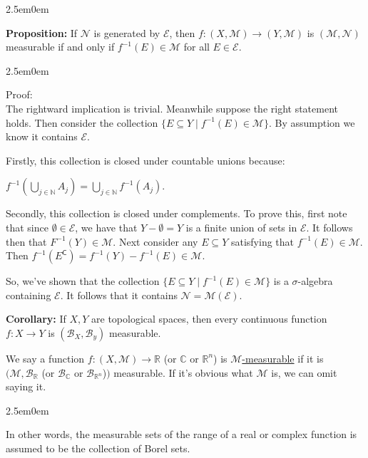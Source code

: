 \documentclass{book}
\newcommand{\hTwo}{%
\color{MidnightBlue}%
   \fontsize{13}{15}\selectfont%
}
\newcommand{\hThree}{%
   \color{PineGreen!85!Orange}
   \fontsize{12}{14}\selectfont%
}
\newenvironment{myIndent}{%
   \begin{adjustwidth}{2.5em}{0em}%
}{%
   \end{adjustwidth}%
}
\newcommand{\udefine}[1]{{%
   \setulcolor{Red}%
   \setul{0.14em}{0.07em}%
   \ul{#1}%
}}
\newcommand{\blab}[1]{\textbf{#1}}
\newcommand{\comp}{\mathsf{C}}
\newcommand{\retTwo}{\hfill\bigbreak}
\begin{document}
\begin{myIndent}\hTwo
   \blab{Proposition:} If $\mathcal{N}$ is generated by $\mathcal{E}$, then $f: (X, \mathcal{M}) \longrightarrow (Y, \mathcal{M})$ is $(\mathcal{M}, \mathcal{N})$ measurable if and only if $f^{-1}(E) \in \mathcal{M}$ for all $E \in \mathcal{E}$.

   \begin{myIndent}\hThree
      Proof:\\
      The rightward implication is trivial. Meanwhile suppose the right statement holds. Then consider the collection $\{E \subseteq Y \mid f^{-1}(E) \in \mathcal{M} \}$. By assumption we know it contains $\mathcal{E}$.\retTwo

      Firstly, this collection is closed under countable unions because:
      
      {\centering $f^{-1}(\bigcup\limits_{j \in \mathbb{N}}A_j) = \bigcup\limits_{j \in \mathbb{N}}f^{-1}(A_j)$.\retTwo\par}

      Secondly, this collection is closed under complements. To prove this, first note that since $\emptyset \in \mathcal{E}$, we have that $Y - \emptyset = Y$ is a finite union of sets in $\mathcal{E}$. It follows then that $F^{-1}(Y) \in \mathcal{M}$. Next consider any $E \subseteq Y$ satisfying that $f^{-1}(E) \in \mathcal{M}$. Then $f^{-1}(E^\comp) = f^{-1}(Y) - f^{-1}(E) \in \mathcal{M}$.\retTwo

      So, we've shown that the collection $\{E \subseteq Y \mid f^{-1}(E) \in \mathcal{M} \}$ is a $\sigma$-algebra\\ containing $\mathcal{E}$. It follows that it contains $\mathcal{N} = \mathcal{M}(\mathcal{E})$.\newpage
   \end{myIndent}

   \blab{Corollary:} If $X, Y$ are topological spaces, then every continuous function\\ $f: X \longrightarrow Y$ is $(\mathcal{B}_X, \mathcal{B}_y)$ measurable.\retTwo
\end{myIndent}

We say a function $f: (X, \mathcal{M}) \longrightarrow \mathbb{R}$ (or $\mathbb{C}$ or $\mathbb{R}^n$) is \udefine{$\mathcal{M}$-measurable} if it is\\ $(\mathcal{M}, \mathcal{B}_{\mathbb{R}}$ (or $\mathcal{B}_{\mathbb{C}}$ or $\mathcal{B}_{\mathbb{R}^n}$)$)$ measurable. If it's obvious what $\mathcal{M}$ is, we can omit\\ saying it.
\begin{myIndent}
   In other words, the measurable sets of the range of a real or complex function is assumed to be the collection of Borel sets.\retTwo
\end{myIndent}
\end{document}
